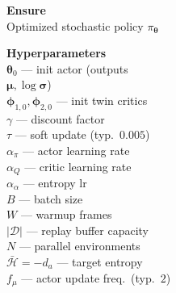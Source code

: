 \documentclass[11pt]{article}
\begin{document}
\begin{algorithm}[p]\small
\caption{SAC --- Practical Vectorized Implementation}\label{alg:sac}
\vspace{2pt}
\noindent
\begin{minipage}[t]{0.28\linewidth}
\renewcommand{\arraystretch}{1.12}
\textbf{Ensure} \\[2pt]
Optimized stochastic policy $\pi_{\boldsymbol{\theta}}$

\vspace{6pt}
\textbf{Hyperparameters} \\[2pt]
$\boldsymbol{\theta}_0$ --- init actor (outputs \\
\hspace*{1em}$\boldsymbol{\mu}, \log\boldsymbol{\sigma}$) \\
$\boldsymbol{\phi}_{1,0}, \boldsymbol{\phi}_{2,0}$ --- init twin critics \\
$\gamma$ --- discount factor \\
$\tau$ --- soft update (typ.\ $0.005$) \\
$\alpha_\pi$ --- actor learning rate \\
$\alpha_Q$ --- critic learning rate \\
$\alpha_\alpha$ --- entropy lr \\
$B$ --- batch size \\
$W$ --- warmup frames \\
$|\mathcal{D}|$ --- replay buffer capacity \\
$N$ --- parallel environments \\
$\bar{\mathcal{H}} = -d_a$ --- target entropy \\
$f_\mu$ --- actor update freq.\ (typ.\ $2$)


\end{minipage}
\end{algorithm}
\end{document}
